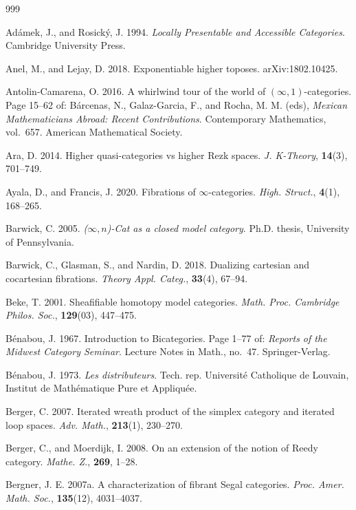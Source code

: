 \begin{thebibliography}{999}

 Adámek, J., and Rosický, J. 1994. \emph{Locally Presentable and
  Accessible Categories}. Cambridge University Press.

 Anel, M., and Lejay, D. 2018. Exponentiable higher toposes.
  arXiv:1802.10425.

 Antolin-Camarena, O. 2016. A whirlwind tour of the world of
  $(\infty,1)$-categories. Page 15--62 of: Bárcenas, N., Galaz-Garcia, F., and
  Rocha, M. M. (eds), \emph{Mexican Mathematicians Abroad: Recent
  Contributions}. Contemporary Mathematics, vol.~657. American Mathematical
  Society.

 Ara, D. 2014. Higher quasi-categories vs higher Rezk spaces.
  \emph{J. K-Theory}, \textbf{14}(3), 701--749.

 Ayala, D., and Francis, J. 2020. Fibrations of
  $\infty$-categories. \emph{High. Struct.}, \textbf{4}(1), 168--265.

 Barwick, C. 2005. \emph{($\infty,n$)-Cat as a closed model
  category}. Ph.D. thesis, University of Pennsylvania.

 Barwick, C., Glasman, S., and Nardin, D. 2018. Dualizing
  cartesian and cocartesian fibrations. \emph{Theory Appl. Categ.},
  \textbf{33}(4), 67--94.

 Beke, T. 2001. Sheafifiable homotopy model categories. \emph{Math.
  Proc. Cambridge Philos. Soc.}, \textbf{129}(03), 447--475.

 Bénabou, J. 1967. Introduction to Bicategories. Page 1--77 of:
  \emph{Reports of the Midwest Category Seminar}. Lecture Notes in Math.,
  no.~47. Springer-Verlag.

 Bénabou, J. 1973. \emph{Les distributeurs}. Tech. rep.
  Université Catholique de Louvain, Institut de Mathématique Pure et
  Appliquée.

 Berger, C. 2007. Iterated wreath product of the simplex category
  and iterated loop spaces. \emph{Adv. Math.}, \textbf{213}(1), 230--270.

 Berger, C., and Moerdijk, I. 2008. On an extension of the notion
  of Reedy category. \emph{Mathe. Z.}, \textbf{269}, 1--28.

 Bergner, J. E. 2007a. A characterization of fibrant Segal
  categories. \emph{Proc. Amer. Math. Soc.}, \textbf{135}(12), 4031--4037.


\end{thebibliography}
